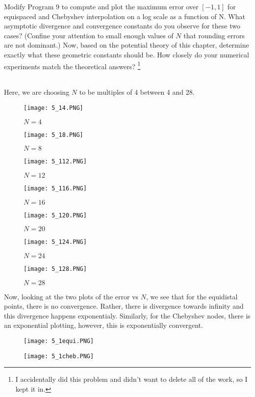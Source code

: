 Modify Program 9 to compute and plot the maximum error over $[-1,1]$ for equispaced and Chebyshev
interpolation on a log scale as a function of N. What asymptotic divergence and convergence constants do
you observe for these two cases? (Confine your attention to small enough values of $N$ that rounding
errors are not dominant.) Now, based on the potential theory of this chapter, determine exactly what
these geometric constants should be. How closely do your numerical experiments match the theoretical
answers?
\footnote{I accidentally did this problem and didn't want to delete all of the work, so I kept it in.}\\

\begin{solution}\renewcommand{\qedsymbol}{}\ \\
    Here, we are choosing $N$ to be multiples of 4 between 4 and 28.\\
    \begin{figure}[htp]
        \centering
        \texttt{[image: 5\_14.PNG]}
        \caption{$N=4$}
    \end{figure}
    \begin{figure}[htp]
        \centering
        \texttt{[image: 5\_18.PNG]}
        \caption{$N=8$}
    \end{figure}
    \begin{figure}[htp]
        \centering
        \texttt{[image: 5\_112.PNG]}
        \caption{$N=12$}
    \end{figure}
    \begin{figure}[htp]
        \centering
        \texttt{[image: 5\_116.PNG]}
        \caption{$N=16$}
    \end{figure}
    \begin{figure}[htp]
        \centering
        \texttt{[image: 5\_120.PNG]}
        \caption{$N=20$}
    \end{figure}
    \begin{figure}[htp]
        \centering
        \texttt{[image: 5\_124.PNG]}
        \caption{$N=24$}
    \end{figure}
    \begin{figure}[htp]
        \centering
        \texttt{[image: 5\_128.PNG]}
        \caption{$N=28$}
    \end{figure}

    Now, looking at the two plots of the error vs $N$, we see that for the equidistal points, there is no convergence.
    Rather, there is divergence towards infinity and this divergence happens exponentialy. Similarly, for the Chebyshev
    nodes, there is an exponential plotting, however, this is exponentially convergent.\\

    \begin{figure}[htp]
        \centering
        \texttt{[image: 5\_1equi.PNG]}
    \end{figure}
    \begin{figure}[htp]
        \centering
        \texttt{[image: 5\_1cheb.PNG]}\\
    \end{figure}

\end{solution}

\newpage

\newpage